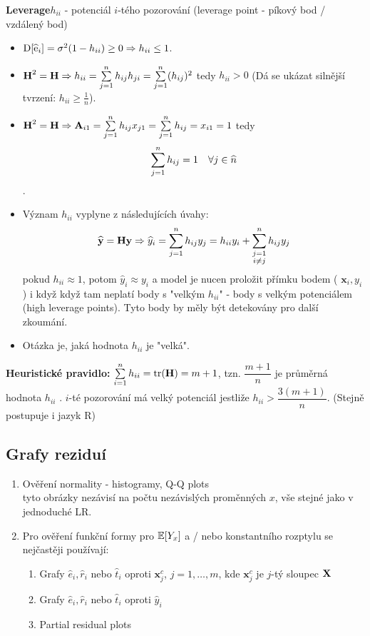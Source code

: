 \textbf{Leverage}$ h_{ii} $ - potenciál $ i $-tého pozorování (leverage point - píkový bod / vzdálený bod)

\begin{itemize}
\item $ \mathrm{D} [ \widehat{\text{e}}_i ] = \sigma^2 ( 1 - h_{ii} ) \geq 0 \Rightarrow h_{ii} \leq 1 $.
\item $ \textbf{H}^2 = \textbf{H} \Rightarrow h_{ii} = \sum\limits_{j=1}^{n} h_{ij} h_{ji} = \sum\limits_{j=1}^{n} (h_{ij})^2 $ tedy $ h_{ii} > 0 $ (Dá se ukázat silnější tvrzení: $ h_{ii} \geq \frac{1}{n} $).
\item $ \textbf{H}^2 = \textbf{H} \Rightarrow \textbf{A}_{i1} = \sum\limits_{j=1}^{n} h_{ij} x_{j1} = \sum\limits_{j=1}^{n} h_{ij} = x_{i1} = 1  $ tedy
$$ \sum\limits_{j=1}^{n} h_{ij} = 1 \quad \forall j \in \widehat{n} $$.
\item Význam $ h_{ii} $ vyplyne z následujících úvahy:
$$ 
 \widehat{\textbf{y}} = \textbf{Hy} \Rightarrow \widehat{y}_i = \sum\limits_{j=1}^{n} h_{ij}y_j = h_{ii} y_i + \sum\limits_{\substack{j=1 \\ i\neq j}}^n h_{ij} y_j
 $$
 pokud $ h_{ii} \approx 1 $, potom   $ \widehat{y}_i \approx y_i $ a model je nucen proložit přímku bodem ( $ \textbf{x}_i , y_i $) i když když tam neplatí body s "velkým $ h_{ii} $" - body s velkým potenciálem (high leverage points). Tyto body by měly být detekovány pro další zkoumání.
 \item Otázka je, jaká hodnota $ h_{ii} $ je "velká".
\end{itemize}
\textbf{Heuristické pravidlo:}
$ \sum\limits_{i=1}^{n} h_{ii} = \text{tr}(\textbf{H}) = m + 1 $, tzn. $ \dfrac{m+1}{n} $ je průměrná hodnota $ h_{ii}$ . $ i $-té pozorování má velký potenciál jestliže $ h_{ii} > \dfrac{3(m+1)}{n} $. (Stejně postupuje i jazyk R)

\subsection{Grafy reziduí}
\begin{enumerate}
\item Ověření normality - histogramy, Q-Q plots \\
tyto obrázky nezávisí na počtu nezávislých proměnných $ x $, vše stejné jako v jednoduché LR.
\item Pro ověření funkční formy pro $ \mathbb{E} [ Y_x ] $ a / nebo konstantního rozptylu se nejčastěji používají:
\begin{enumerate}
\item Grafy $ \widehat{e}_i , \widehat{r}_i $ nebo $ \widehat{t}_i $ oproti $ \textbf{x}_j^c $, $ j = 1, \dots , m $, kde $ \textbf{x}_j^c $ je $ j $-tý sloupec $ \textbf{X} $
\item  Grafy $ \widehat{e}_i , \widehat{r}_i $ nebo $ \widehat{t}_i $ oproti $ \widehat{y}_i $
\item Partial residual plots
\end{enumerate}
\end{enumerate}

